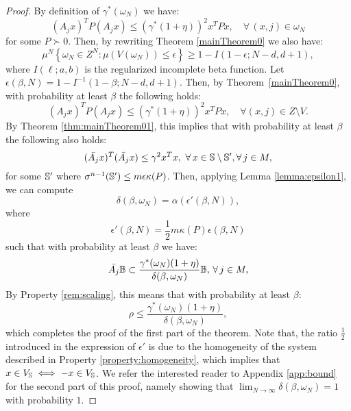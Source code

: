 \begin{proof}
By definition of $\gamma^*(\omega_N)$ we have:
\begin{equation*} (A_j x)^TP(A_j x) \leq {(\gamma^*(1+\eta))}^2 x^TPx, \quad \forall\, (x, j)  \in \omega_N \end{equation*}
for some $P \succ 0$. 
Then, by rewriting Theorem \ref{mainTheorem0} we also have:
\begin{equation}\label{eqn:violation2}\mu^N\left\{\omega_N \in Z^N : \mu(V(\omega_N)) \leq \epsilon \right\} \geq 1- I(1-\epsilon; N-d, d+1),\end{equation}
where $I(\ell;a,b)$ is the regularized incomplete beta function. Let $\epsilon(\beta, N)=1- I^{-1}(1-\beta; N-d, d+1)$. 
Then, by Theorem~\ref{mainTheorem0}, with probability at least $\beta$ the following holds:
\begin{equation*} (A_jx)^TP(A_jx) \leq  {(\gamma^*(1+\eta))}^2 x^TPx, \quad \forall (x, j) \in Z \setminus V.\end{equation*}
By Theorem \ref{thm:mainTheorem01}, this implies that with probability at least $\beta$ the following also holds:
\begin{equation*}(\bar{A_j} x)^T(\bar{A_j} x) \leq {\gamma}^2x^Tx,\,\, \forall\, x \in \mathbb{S} \setminus \mathbb{S}', \forall\, j \in M,\end{equation*}
for some $\mathbb{S}'$ where $\sigma^{n-1}(\mathbb{S}') \leq m\epsilon \kappa(P)$. Then, applying Lemma \ref{lemma:epsilon1}, we can compute
$$\delta(\beta, \omega_N) =\alpha(\epsilon'(\beta,N)),$$
where
\begin{equation}\label{eqn:eps2}\epsilon'(\beta, N) = \frac{1}{2} m\kappa(P)\epsilon(\beta,N)\end{equation} such that with probability at least $\beta$ we have:
\begin{equation*}
\bar{A_j} \mathbb{B} \subset \frac{\gamma^*(\omega_N)(1+\eta)}{\delta(\beta, \omega_N)}\mathbb{B},\, \forall\, j \in M,
\end{equation*}
By Property \ref{rem:scaling}, this means that with probability at least $\beta$:
$$\rho \leq \frac{\gamma^*(\omega_N) (1 + \eta)}{\delta(\beta, \omega_N)},$$
which completes the proof of the first part of the theorem. Note that, the ratio $\frac{1}{2}$ introduced in the expression of $\epsilon'$ is due to the homogeneity of the system described in Property \ref{property:homogeneity}, which implies that $x \in V_{\mathbb{S}} \iff -x \in V_{\mathbb{S}}$. We refer the interested reader to Appendix \ref{app:bound} for the second part of this proof, namely showing that $\lim_{N \to \infty}\delta(\beta, \omega_N) = 1$ with probability $1$.



%
\end{proof}

